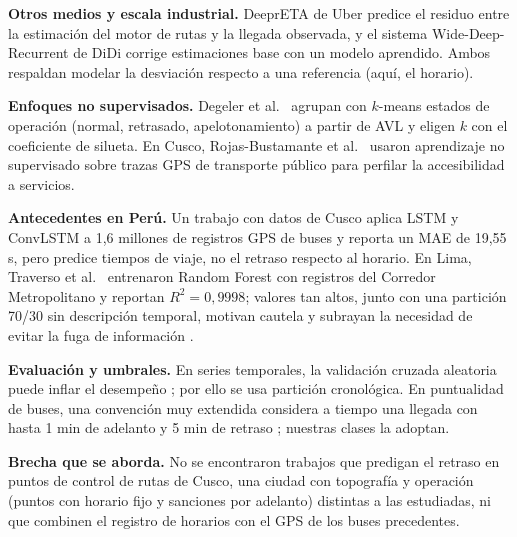 \documentclass[conference,spanish]{IEEEtran}
\begin{document}
\textbf{Otros medios y escala industrial.} DeeprETA de Uber \cite{hu2022deepreta} predice el residuo entre la estimación del motor de rutas y la llegada observada, y el sistema Wide-Deep-Recurrent de DiDi \cite{wang2018wdr} corrige estimaciones base con un modelo aprendido. Ambos respaldan modelar la desviación respecto a una referencia (aquí, el horario).

\textbf{Enfoques no supervisados.} Degeler et al.\ \cite{degeler2021} agrupan con $k$-means estados de operación (normal, retrasado, apelotonamiento) a partir de AVL y eligen $k$ con el coeficiente de silueta. En Cusco, Rojas-Bustamante et al.\ \cite{rojas2023} usaron aprendizaje no supervisado sobre trazas GPS de transporte público para perfilar la accesibilidad a servicios.

\textbf{Antecedentes en Perú.} Un trabajo con datos de Cusco \cite{cusco2024} aplica LSTM y ConvLSTM a 1,6 millones de registros GPS de buses y reporta un MAE de 19,55 s, pero predice tiempos de viaje, no el retraso respecto al horario. En Lima, Traverso et al.\ \cite{traverso2025} entrenaron Random Forest con registros del Corredor Metropolitano y reportan $R^2=0{,}9998$; valores tan altos, junto con una partición 70/30 sin descripción temporal, motivan cautela y subrayan la necesidad de evitar la fuga de información \cite{kaufman2012}.

\textbf{Evaluación y umbrales.} En series temporales, la validación cruzada aleatoria puede inflar el desempeño \cite{bergmeir2012}; por ello se usa partición cronológica. En puntualidad de buses, una convención muy extendida considera a tiempo una llegada con hasta 1 min de adelanto y 5 min de retraso \cite{tcrp2003}; nuestras clases la adoptan.

\textbf{Brecha que se aborda.} No se encontraron trabajos que predigan el retraso en puntos de control de rutas de Cusco, una ciudad con topografía y operación (puntos con horario fijo y sanciones por adelanto) distintas a las estudiadas, ni que combinen el registro de horarios con el GPS de los buses precedentes.
\end{document}
